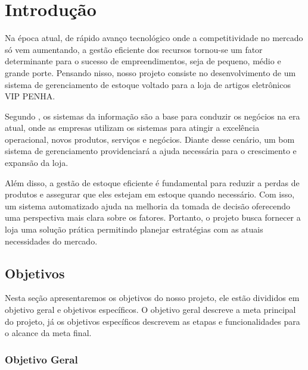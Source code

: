 \documentclass[
	12pt,				%
	openany,			%
	twoside,			%
	a4paper,			%
	english,			%
	brazil				%
	]{abntex2}
\begin{document}
\textual

\chapter{Introdução}

Na época atual, de rápido avanço tecnológico onde a competitividade no mercado só vem aumentando, a gestão eficiente dos recursos tornou-se um fator determinante para o sucesso de empreendimentos, seja de pequeno, médio e grande porte. Pensando nisso, nosso projeto consiste no desenvolvimento de um sistema de gerenciamento de estoque voltado para a loja de artigos eletrônicos VIP PENHA.

Segundo   , os sistemas da informação são a base para conduzir os negócios na era atual, onde as empresas utilizam os sistemas para atingir a excelência operacional, novos produtos, serviços e negócios. Diante desse cenário, um bom sistema de gerenciamento providenciará a ajuda necessária para o crescimento e expansão da loja.

Além disso, a gestão de estoque eficiente é fundamental para reduzir a perdas de produtos e assegurar que eles estejam em estoque quando necessário. Com isso, um sistema automatizado ajuda na melhoria da tomada de decisão oferecendo uma perspectiva mais clara sobre os fatores. Portanto, o projeto busca fornecer a loja uma solução prática permitindo planejar estratégias com as atuais necessidades do mercado.


\section{Objetivos}

Nesta seção apresentaremos os objetivos do nosso projeto, ele estão divididos em objetivo geral e objetivos específicos. O objetivo geral descreve a meta principal do projeto, já os objetivos específicos descrevem as etapas e funcionalidades para o alcance da meta final.

\subsection{Objetivo Geral}
\end{document}
